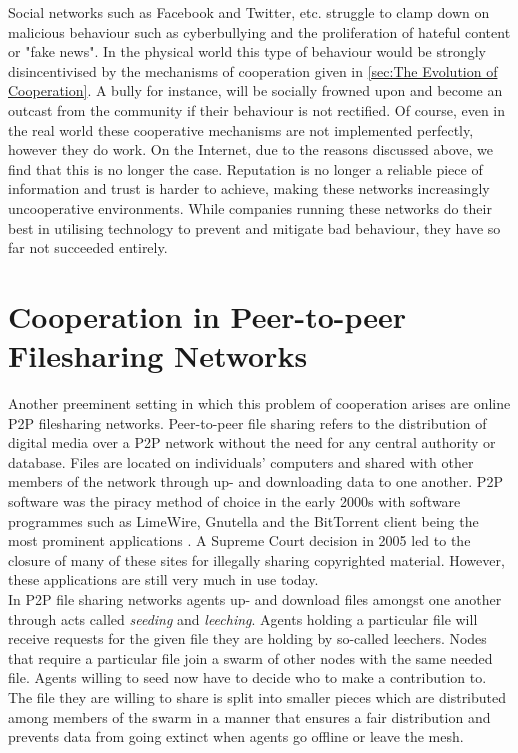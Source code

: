 \noindent{}Social networks such as Facebook and Twitter, etc. struggle to clamp down on malicious behaviour such as cyberbullying and the proliferation of hateful content or "fake news". In the physical world this type of behaviour would be strongly disincentivised by the mechanisms of cooperation given in \ref{sec:The Evolution of Cooperation}. A bully for instance, will be socially frowned upon and become an outcast from the community if their behaviour is not rectified. Of course, even in the real world these cooperative mechanisms are not implemented perfectly, however they do work. On the Internet, due to the reasons discussed above, we find that this is no longer the case. Reputation is no longer a reliable piece of information and trust is harder to achieve, making these networks increasingly uncooperative environments. While companies running these networks do their best in utilising technology to prevent and mitigate bad behaviour, they have so far not succeeded entirely.\vspace{1em}\\ 


\section{Cooperation in Peer-to-peer Filesharing Networks}
\label{sec:Cooperation in Peer-to-peer Filesharing Networks}
\noindent{}Another preeminent setting in which this problem of cooperation arises are online P2P filesharing networks. Peer-to-peer file sharing refers to the distribution of digital media over a P2P network without the need for any central authority or database. Files are located on individuals' computers and shared with other members of the network through up- and downloading data to one another. P2P software was the piracy method of choice in the early 2000s with software programmes such as LimeWire, Gnutella and the BitTorrent client being the most prominent applications \cite{The Early Days of Mass Internet Piracy Were Awesome Yet Awful}. A Supreme Court decision in 2005 led to the closure of many of these sites for illegally sharing copyrighted material. However, these applications are still very much in use today.\vspace{1em}\\

\noindent{}In P2P file sharing networks agents up- and download files amongst one another through acts called {\it seeding} and {\it leeching}. Agents holding a particular file will receive requests for the given file they are holding by so-called leechers. Nodes that require a particular file join a swarm of other nodes with the same needed file. Agents willing to seed now have to decide who to make a contribution to. The file they are willing to share is split into smaller pieces which are distributed among members of the swarm in a manner that ensures a fair distribution and prevents data from going extinct when agents go offline or leave the mesh. \vspace{1em}\\

